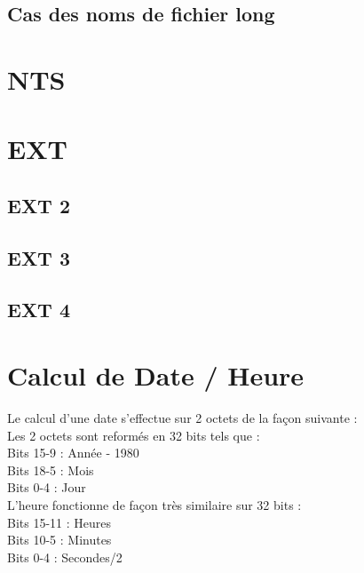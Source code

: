 \documentclass[11pt]{report}
\begin{document}
\section{Cas des noms de fichier long}


\chapter{NTS}

\chapter{EXT}

\section{EXT 2}

\section{EXT 3}

\section{EXT 4}

\appendix
\chapter{Calcul de Date / Heure}
Le calcul d'une date s'effectue sur 2 octets de la façon suivante : \\
Les 2 octets sont reformés en 32 bits tels que : \\
Bits 15-9 : Année - 1980 \\
Bits 18-5 : Mois \\
Bits 0-4 : Jour \\
L'heure fonctionne de façon très similaire sur 32 bits : \\
Bits 15-11 : Heures \\
Bits 10-5 : Minutes \\
Bits 0-4 : Secondes/2 \\
\end{document}
